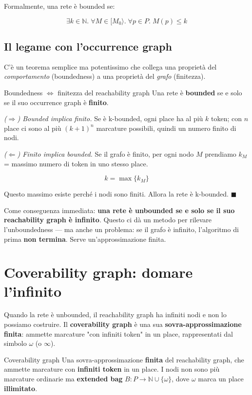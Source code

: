 Formalmente, una rete è bounded se:

\[
\exists k \in \mathbb{N}.\; \forall M \in [M_0\rangle.\; \forall p \in P.\; M(p) \le k
\]

\subsection{\texorpdfstring{Il legame con l'occurrence graph}{Il legame con l'occurrence graph}}

C'è un teorema semplice ma potentissimo che collega una proprietà del \emph{comportamento} (boundedness) a una proprietà del \emph{grafo} (finitezza).

\begin{boxtheorem}{Boundedness $\Longleftrightarrow$ finitezza del reachability graph}
Una rete è \textbf{bounded} se e solo se il suo occurrence graph è \textbf{finito}.

\emph{($\Rightarrow$) Bounded implica finito.} Se è k-bounded, ogni place ha al più $k$ token; con $n$ place ci sono al più $(k+1)^n$ marcature possibili, quindi un numero finito di nodi.

\emph{($\Leftarrow$) Finito implica bounded.} Se il grafo è finito, per ogni nodo $M$ prendiamo $k_M$ = massimo numero di token in uno stesso place.

\[
k = \max\{k_M\}
\]

Questo massimo esiste perché i nodi sono finiti. Allora la rete è k-bounded. $\blacksquare$
\end{boxtheorem}

Come conseguenza immediata: \textbf{una rete è unbounded se e solo se il suo reachability graph è infinito}. Questo ci dà un metodo per rilevare l'unboundedness — ma anche un problema: se il grafo è infinito, l'algoritmo di prima \textbf{non termina}. Serve un'approssimazione finita.

\section{\texorpdfstring{Coverability graph: domare l'infinito}{Coverability graph: domare l'infinito}}

Quando la rete è unbounded, il reachability graph ha infiniti nodi e non lo possiamo costruire. Il \textbf{coverability graph} è una sua \textbf{sovra-approssimazione finita}: ammette marcature "con infiniti token" in un place, rappresentati dal simbolo $\omega$ (o $\infty$).

\begin{boxdefinition}{Coverability graph}
Una sovra-approssimazione \textbf{finita} del reachability graph, che ammette marcature con \textbf{infiniti token} in un place. I nodi non sono più marcature ordinarie ma \textbf{extended bag} $B : P \to \mathbb{N} \cup \{\omega\}$, dove $\omega$ marca un place \textbf{illimitato}.
\end{boxdefinition}


